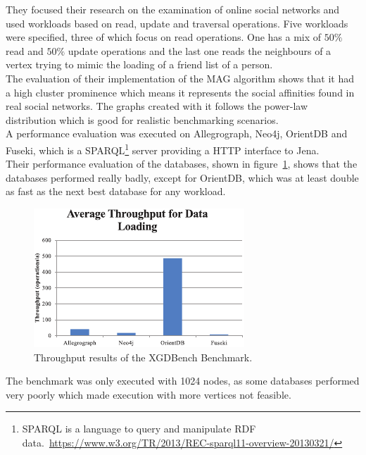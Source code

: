 They focused their research on the examination of online social networks and used workloads based on read, update and traversal operations.
Five workloads were specified,
three of which focus on read operations.
One has a mix of $ 50\% $ read and $ 50\% $ update operations and the last one reads the neighbours of a vertex trying to mimic the loading of a friend list of a person.\\
The evaluation of their implementation of the MAG algorithm shows that it had a high cluster prominence which means it represents the social affinities found in real social networks.
The graphs created with it follows the power-law distribution which is good for realistic benchmarking scenarios.\\
A performance evaluation was executed on Allegrograph, Neo4j, OrientDB and Fuseki,
which is a SPARQL\footnote{SPARQL is a language to query and manipulate RDF data.~\url{https://www.w3.org/TR/2013/REC-sparql11-overview-20130321/}} server providing a HTTP interface to Jena.\\
Their performance evaluation of the databases,
shown in figure~\ref{fig:backgroundXGDBenchResultsInsert},
shows that the databases performed really badly,
except for OrientDB,
which was at least double as fast as the next best database for any workload.

\begin{figure}[h!]
  \centering
  \includegraphics[width=.75\textwidth]{images/benchmarks/XGDBenchResultsInsert}
  \caption{Throughput results of the XGDBench Benchmark.~\cite{Dayarathna2012}}
  \label{fig:backgroundXGDBenchResultsInsert}
\end{figure}

The benchmark was only executed with 1024 nodes,
as some databases performed very poorly which made execution with more vertices not feasible.

